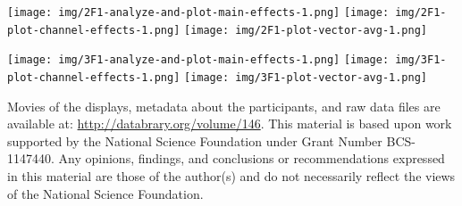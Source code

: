 \documentclass[landscape,final,paperwidth=72in,paperheight=42in,fontscale=0.285]{baposter}
\begin{document}
\begin{poster}
{}
{

\begin{center}

  \texttt{[image: img/2F1-analyze-and-plot-main-effects-1.png]}
  \hfill
  \texttt{[image: img/2F1-plot-channel-effects-1.png]}
  \hfill
  \texttt{[image: img/2F1-plot-vector-avg-1.png]}
  
\end{center}

}
{

\begin{center}
  \texttt{[image: img/3F1-analyze-and-plot-main-effects-1.png]}
  \hfill
  \texttt{[image: img/3F1-plot-channel-effects-1.png]}
  \hfill
  \texttt{[image: img/3F1-plot-vector-avg-1.png]}
\end{center}

}
    {
       Movies of the displays, metadata about the participants, and raw data files are available at: \url{http://databrary.org/volume/146}.
     }  
    {
    \smaller
      This material is based upon work supported by the National Science Foundation under Grant Number BCS-1147440. Any opinions, findings, and conclusions or recommendations expressed in this material are those of the author(s) and do not necessarily reflect the views of the National Science Foundation.  
    }    
  {
          \tiny
          \renewcommand{\refname}{\vspace{-0.5em}} %
%          
%          
          
          
          

}

\end{poster}%
%
\end{document}

